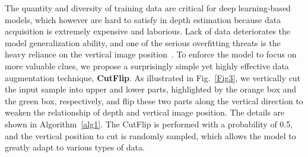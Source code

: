 \documentclass[letterpaper]{article} \usepackage{aaai23}  \usepackage{times}  \usepackage{helvet}  \usepackage{courier}  \usepackage[hyphens]{url}  \usepackage{graphicx} \urlstyle{rm} \def\UrlFont{\rm}  \usepackage{natbib}  \usepackage{caption} \frenchspacing  \setlength{\pdfpagewidth}{8.5in} \setlength{\pdfpageheight}{11in} \usepackage{algorithm}
\begin{document}
The quantity and diversity of training data are critical for deep learning-based models, which however are hard to satisfy in depth estimation because data acquisition is extremely expensive and laborious. Lack of data deteriorates the model generalization ability, and one of the serious overfitting threats is the heavy reliance on the vertical image position~\cite{dijk2019neural}. To enforce the model to focus on more valuable clues, we propose a surprisingly simple yet highly effective data augmentation technique, \textbf{CutFlip}. As illustrated in Fig.~\ref{Fig3}, we vertically cut the input sample into upper and lower parts, highlighted by the orange box and the green box, respectively, and flip these two parts along the vertical direction to weaken the relationship of depth and vertical image position. The details are shown in Algorithm~\ref{alg1}. The CutFlip is performed with a probability of 0.5, and the vertical position to cut is randomly sampled, which allows the model to greatly adapt to various types of data. 
\end{document}
